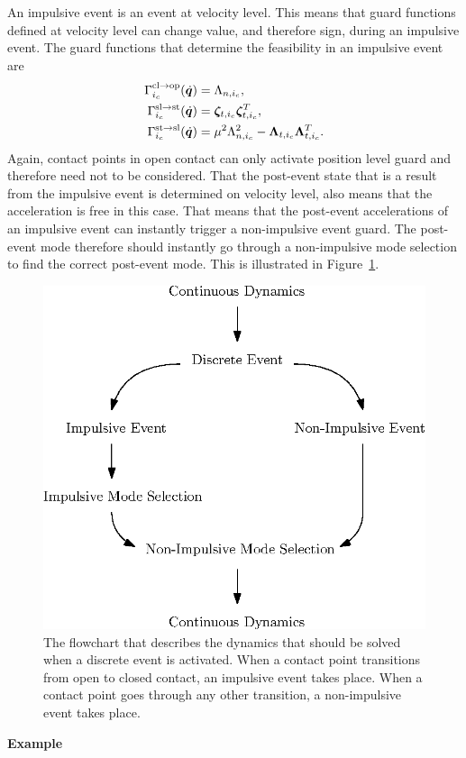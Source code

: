 \documentclass[../DC2017114Bouma.tex]{subfiles}
\begin{document}
An impulsive event is an event at velocity level. This means that guard functions defined at velocity level can change value, and therefore sign, during an impulsive event. The guard functions that determine the feasibility in an impulsive event are
\begin{align}
\Gamma^{\text{cl}\rightarrow\text{op}}_{i_c}(\dot{{\boldsymbol{q}}}) &= \Lambda_{n,i_c},\\
\Gamma^{\text{sl}\rightarrow\text{st}}_{i_c}(\dot{{\boldsymbol{q}}}) &= \boldsymbol{\zeta}_{t,i_c}\boldsymbol{\zeta}_{t,i_c}^T,\\
\Gamma^{\text{st}\rightarrow\text{sl}}_{i_c}(\dot{{\boldsymbol{q}}}) &= \mu^2\Lambda_{n,i_c}^2 - \boldsymbol{\Lambda}_{t,i_c}\boldsymbol{\Lambda}_{t,i_c}^T.
\end{align}
Again, contact points in open contact can only activate position level guard and therefore need not to be considered. That the post-event state that is a result from the impulsive event is determined on velocity level, also means that the acceleration is free in this case. That means that the post-event accelerations of an impulsive event can instantly trigger a non-impulsive event guard. The post-event mode therefore should instantly go through a non-impulsive mode selection to find the correct post-event mode. This is illustrated in Figure~\ref{fig:2eventflowchart}.

\begin{figure}[h]
\centering
\includegraphics[width=.6\textwidth]{eventflowchart.eps}\caption{The flowchart that describes the dynamics that should be solved when a discrete event is activated. When a contact point transitions from open to closed contact, an impulsive event takes place. When a contact point goes through any other transition, a non-impulsive event takes place.} \label{fig:2eventflowchart}
\end{figure}

\textbf{Example}
\end{document}
